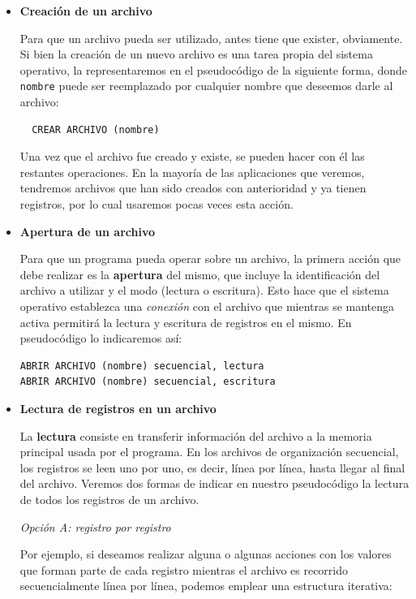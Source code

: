 \documentclass[
]{book}
\begin{document}
\begin{itemize}
\item
  \textbf{Creación de un archivo}

  Para que un archivo pueda ser utilizado, antes tiene que exister, obviamente. Si bien la creación de un nuevo archivo es una tarea propia del sistema operativo, la representaremos en el pseudocódigo de la siguiente forma, donde \texttt{nombre} puede ser reemplazado por cualquier nombre que deseemos darle al archivo:

\begin{verbatim}
  CREAR ARCHIVO (nombre)
\end{verbatim}

  Una vez que el archivo fue creado y existe, se pueden hacer con él las restantes operaciones. En la mayoría de las aplicaciones que veremos, tendremos archivos que han sido creados con anterioridad y ya tienen registros, por lo cual usaremos pocas veces esta acción.
\item
  \textbf{Apertura de un archivo}

  Para que un programa pueda operar sobre un archivo, la primera acción que debe realizar es la \textbf{apertura} del mismo, que incluye la identificación del archivo a utilizar y el modo (lectura o escritura). Esto hace que el sistema operativo establezca una \emph{conexión} con el archivo que mientras se mantenga activa permitirá la lectura y escritura de registros en el mismo. En pseudocódigo lo indicaremos así:

\begin{verbatim}
ABRIR ARCHIVO (nombre) secuencial, lectura
ABRIR ARCHIVO (nombre) secuencial, escritura
\end{verbatim}
\item
  \textbf{Lectura de registros en un archivo}

  La \textbf{lectura} consiste en transferir información del archivo a la memoria principal usada por el programa. En los archivos de organización secuencial, los registros se leen uno por uno, es decir, línea por línea, hasta llegar al final del archivo. Veremos dos formas de indicar en nuestro pseudocódigo la lectura de todos los registros de un archivo.

  \emph{Opción A: registro por registro}

  Por ejemplo, si deseamos realizar alguna o algunas acciones con los valores que forman parte de cada registro mientras el archivo es recorrido secuencialmente línea por línea, podemos emplear una estructura iterativa:


\end{itemize}
\end{document}
